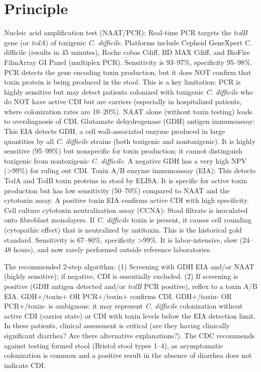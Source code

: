 \section*{Principle}
Nucleic acid amplification test (NAAT/PCR): Real-time PCR targets the \textit{tcdB} gene (or \textit{tcdA}) of toxigenic \textit{C. difficile}. Platforms include Cepheid GeneXpert C. difficile (results in 45 minutes), Roche cobas Cdiff, BD MAX Cdiff, and BioFire FilmArray GI Panel (multiplex PCR). Sensitivity is 93--97\%, specificity 95--98\%. PCR detects the gene encoding toxin production, but it does NOT confirm that toxin protein is being produced in the stool. This is a key limitation: PCR is highly sensitive but may detect patients colonized with toxigenic \textit{C. difficile} who do NOT have active CDI but are carriers (especially in hospitalized patients, where colonization rates are 10--20\%). NAAT alone (without toxin testing) leads to overdiagnosis of CDI. Glutamate dehydrogenase (GDH) antigen immunoassay: This EIA detects GDH, a cell wall-associated enzyme produced in large quantities by all \textit{C. difficile} strains (both toxigenic and nontoxigenic). It is highly sensitive (95--99\%) but nonspecific for toxin production; it cannot distinguish toxigenic from nontoxigenic \textit{C. difficile}. A negative GDH has a very high NPV (>99\%) for ruling out CDI. Toxin A/B enzyme immunoassay (EIA): This detects TcdA and TcdB toxin proteins in stool by ELISA. It is specific for active toxin production but has low sensitivity (50--70\%) compared to NAAT and the cytotoxin assay. A positive toxin EIA confirms active CDI with high specificity. Cell culture cytotoxin neutralization assay (CCNA): Stool filtrate is inoculated onto fibroblast monolayers. If \textit{C. difficile} toxin is present, it causes cell rounding (cytopathic effect) that is neutralized by antitoxin. This is the historical gold standard. Sensitivity is 67--80\%, specificity >99\%. It is labor-intensive, slow (24--48 hours), and now rarely performed outside reference laboratories.

The recommended 2-step algorithm: (1) Screening with GDH EIA and/or NAAT (highly sensitive); if negative, CDI is essentially excluded. (2) If screening is positive (GDH antigen detected and/or \textit{tcdB} PCR positive), reflex to a toxin A/B EIA. GDH+/toxin+ OR PCR+/toxin+ confirms CDI. GDH+/toxin- OR PCR+/toxin- is ambiguous: it may represent \textit{C. difficile} colonization without active CDI (carrier state) or CDI with toxin levels below the EIA detection limit. In these patients, clinical assessment is critical (are they having clinically significant diarrhea? Are there alternative explanations?). The CDC recommends against testing formed stool (Bristol stool types 1--4), as asymptomatic colonization is common and a positive result in the absence of diarrhea does not indicate CDI.

